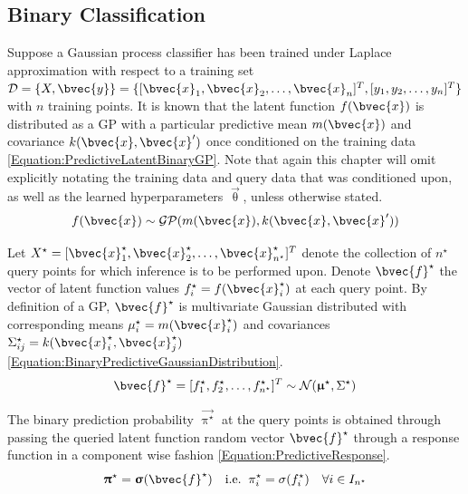 		\subsection{Binary Classification}
		\label{InformativeSeafloorExploration:MCPIE:Binary}
		
			Suppose a Gaussian process classifier has been trained under Laplace approximation with respect to a training set $\mathcal{D} = \{X, \bvec{y}\} = \{[ \bvec{x}_{1}, \bvec{x}_{2}, \dots, \bvec{x}_{n}]^{T}, [y_{1}, y_{2}, \dots, y_{n}]^{T}\}$ with $n$ training points. It is known that the latent function $f(\bvec{x})$ is distributed as a GP with a particular predictive mean $m(\bvec{x})$ and covariance $k(\bvec{x}, \bvec{x}')$ once conditioned on the training data \eqref{Equation:PredictiveLatentBinaryGP}. Note that again this chapter will omit explicitly notating the training data and query data that was conditioned upon, as well as the learned hyperparameters $\vec{\uptheta}$, unless otherwise stated. \begin{equation}
				f(\bvec{x}) \sim \mathcal{GP}(m(\bvec{x}), k(\bvec{x}, \bvec{x}'))
			\label{Equation:PredictiveLatentBinaryGP}
			\end{equation}
			
			Let $X^{\star} = [ \bvec{x}^{\star}_{1}, \bvec{x}^{\star}_{2}, \dots, \bvec{x}^{\star}_{n^{\star}}]^{T}$ denote the collection of $n^{\star}$ query points for which inference is to be performed upon. Denote $\bvec{f}^{\star}$ the vector of latent function values $f^{\star}_{i} = f(\bvec{x}^{\star}_{i})$ at each query point. By definition of a GP, $\bvec{f}^{\star}$ is multivariate Gaussian distributed with corresponding means $\mu^{\star}_{i} = m(\bvec{x}^{\star}_{i})$ and covariances $\Sigma^{\star}_{ij} = k(\bvec{x}^{\star}_{i}, \bvec{x}^{\star}_{j})$ \eqref{Equation:BinaryPredictiveGaussianDistribution}. \begin{equation}
				\bvec{f}^{\star} = [f^{\star}_{1}, f^{\star}_{2}, \dots, f^{\star}_{n^{\star}}]^{T} \sim \mathcal{N}(\vec{\upmu}^{\star}, \Sigma^{\star})
			\label{Equation:BinaryPredictiveGaussianDistribution}
			\end{equation}
				
			The binary prediction probability $\vec{\uppi^{\star}}$ at the query points is obtained through passing the queried latent function random vector $\bvec{f}^{\star}$ through a response function in a component wise fashion \eqref{Equation:PredictiveResponse}. \begin{equation}
				\vec{\uppi}^{\star} = \vec{\upsigma}(\bvec{f}^{\star})\mathrm{ \quad i.e. \;\;}\pi^{\star}_{i} = \sigma(f^{\star}_{i}) \quad \forall i \in I_{n^{\star}}
			\label{Equation:PredictiveResponse}
			\end{equation}
			
